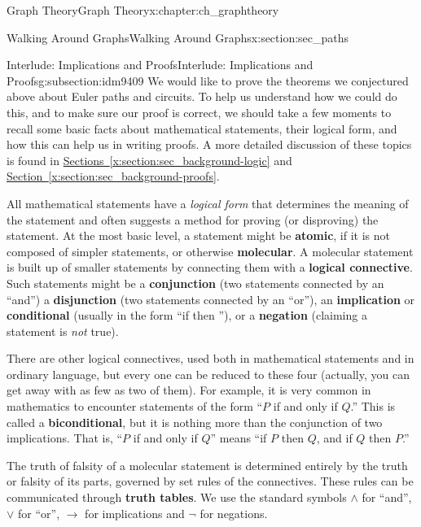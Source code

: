 \documentclass[oneside,10pt,]{book}
\newcommand{\terminology}[1]{\textbf{#1}}
\numberwithin{equation}{chapter}
\def\imp{\rightarrow}
\begin{document}
\begin{chapterptx}{Graph Theory}{}{Graph Theory}{}{}{x:chapter:ch_graphtheory}
\begin{sectionptx}{Walking Around Graphs}{}{Walking Around Graphs}{}{}{x:section:sec_paths}
\typeout{************************************************}
%
\begin{subsectionptx}{Interlude: Implications and Proofs}{}{Interlude: Implications and Proofs}{}{}{g:subsection:idm9409}
We would like to prove the theorems we conjectured above about Euler paths and circuits.  To help us understand how we could do this, and to make sure our proof is correct, we should take a few moments to recall some basic facts about mathematical statements, their logical form, and how this can help us in writing proofs.  A more detailed discussion of these topics is found in \hyperref[x:section:sec_background-logic]{Sections~\ref{x:section:sec_background-logic}} and \hyperref[x:section:sec_background-proofs]{Section~\ref{x:section:sec_background-proofs}}.%
\par
All mathematical statements have a \emph{logical form} that determines the meaning of the statement and often suggests a method for proving (or disproving) the statement.  At the most basic level, a statement might be \terminology{atomic}, if it is not composed of simpler statements, or otherwise \terminology{molecular}.  A molecular statement is built up of smaller statements by connecting them with a \terminology{logical connective}. Such statements might be a \terminology{conjunction} (two statements connected by an ``and'') a \terminology{disjunction} (two statements connected by an ``or''), an \terminology{implication} or \terminology{conditional} (usually in the form ``if \textellipsis{} then \textellipsis{}''), or a \terminology{negation} (claiming a statement is \emph{not} true).%
\par
There are other logical connectives, used both in mathematical statements and in ordinary language, but every one can be reduced to these four (actually, you can get away with as few as two of them).   For example, it is very common in mathematics to encounter statements of the form ``\(P\) if and only if \(Q\).''  This is called a \terminology{biconditional}, but it is nothing more than the conjunction of two implications.  That is, ``\(P\) if and only if \(Q\)'' means ``if \(P\) then \(Q\), and if \(Q\) then \(P\).''%
\par
The truth of falsity of a molecular statement is determined entirely by the truth or falsity of its parts, governed by set rules of the connectives.  These rules can be communicated through \terminology{truth tables}.  We use the standard symbols \(\wedge\) for ``and'', \(\vee\) for ``or'', \(\imp\) for implications and \(\neg\) for negations.%

\end{subsectionptx}
\end{sectionptx}
\end{chapterptx}
\end{document}

